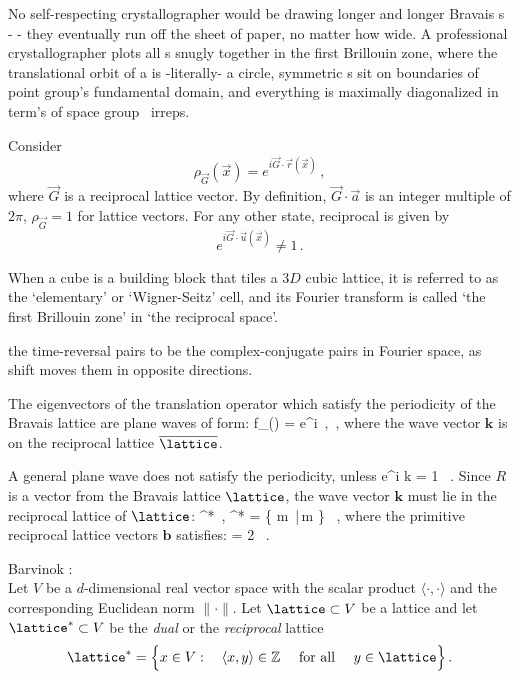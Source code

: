 \bigskip

No self-respecting crystallographer would be drawing longer and longer
Bravais {\lattstate}s - - they
eventually run off the sheet of paper, no matter how wide.
A professional crystallographer plots all {\lattstate}s snugly together
in the first Brillouin zone, where the translational orbit of a
{\lattstate} is -literally- a circle, symmetric  {\lattstate}s sit on
boundaries of point group's fundamental domain, and everything is
maximally diagonalized in term's of space group \Group\ irreps.

Consider
\[
\rho_{\vec{G}}(\vec{x})= e^{i\vec{G}\cdot\vec{r}(\vec{x})}
\,,
\]
where $\vec{G}$ is a reciprocal lattice vector. By definition,
$\vec{G}\cdot\vec{a}$ is an integer multiple of $2\pi$, $\rho_{\vec{G}}=1$ for
lattice vectors.
For any other state, reciprocal {\lattstate} is given by
\[
e^{i\vec{G}\cdot\vec{u}(\vec{x})} \neq 1
\,.
\]

When a
cube is a building block that tiles a $3D$ cubic lattice, it is referred
to as the `elementary' or `Wigner-Seitz' cell, and its Fourier transform
is called `the first Brillouin zone' in `the reciprocal space'.



the time-reversal pairs
to be the complex-conjugate pairs in Fourier space, as \Cn{\infty} shift
moves them in opposite directions.

The eigenvectors of the translation operator which satisfy the
periodicity of the Bravais lattice %
are plane waves of form:
\beq
f_() = e^{i  \cdot {}}
  \,, \quad
{} \in \overline{\lattice}
\,,
where the wave vector $\mathbf{k}$ is on the reciprocal lattice
$\overline{\lattice}$.

 A general plane wave does not
satisfy the periodicity, unless
\beq
e^{i {k} } = 1
\, .
Since ${R}$ is a vector from the Bravais lattice $\lattice$, the wave
vector $\mathbf{k}$ must lie in the reciprocal lattice of $\lattice$:
\beq
{} \in \lattice^*
\,,\quad
\lattice^* =
\left\{ m \,|\,m \in {}\right\} \, ,
where the primitive reciprocal lattice vectors $\mathbf{b}$ satisfies:
 \beq
{} \cdot {} = 2 \pi
\, .


Barvinok :
\\
Let $V$ be a $d$-dimensional real vector space with the scalar product
$\langle \cdot, \cdot \rangle$
and the corresponding Euclidean norm $\| \cdot\|$. Let $\lattice \subset V$ be a lattice
and let  $\lattice^{\ast} \subset V$ be the {\it dual} or the {\it reciprocal} lattice
\[
\lattice^{\ast}=\Bigl\{x \in V: \quad \langle x, y \rangle \in {\Bbb Z}
\quad
\mbox{ for all } \quad y \in \lattice \Bigr\}
\,.
\]

